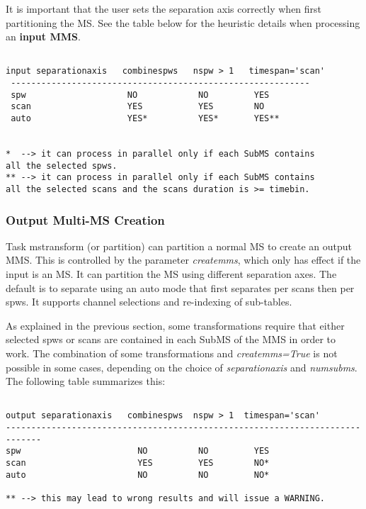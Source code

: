 It is important that the user sets the separation axis correctly when first
partitioning the MS. See the table below for the heuristic details when
processing an {\bf input MMS}.

\begin{verbatim}

input separationaxis   combinespws   nspw > 1   timespan='scan'
 -----------------------------------------------------------
 spw                    NO            NO         YES        
 scan                   YES           YES        NO           
 auto                   YES*          YES*       YES**               
                

*  --> it can process in parallel only if each SubMS contains
all the selected spws.
** --> it can process in parallel only if each SubMS contains
all the selected scans and the scans duration is >= timebin.
\end{verbatim}

\subsubsection{Output Multi-MS Creation}
Task mstransform (or partition) can partition a normal MS to create an output
MMS. This is controlled by the parameter {\it createmms}, which only has effect
if the input is an MS. It can partition the MS using different separation axes.
The default is to separate using an auto mode that first separates per scans
then per spws. It supports channel selections and re-indexing of sub-tables. 

As explained in the previous section, some transformations require
that either selected spws or scans are contained in each SubMS of the MMS
in order to work. The combination of some transformations and {\it
createmms=True} is not possible in some cases, depending on the choice of {\it
separationaxis} and {\it numsubms}. The following table summarizes this:

\begin{verbatim}

output separationaxis   combinespws  nspw > 1  timespan='scan'
-----------------------------------------------------------------------------
spw                       NO          NO         YES    
scan                      YES         YES        NO*   
auto                      NO          NO         NO*   

** --> this may lead to wrong results and will issue a WARNING.

\end{verbatim}

